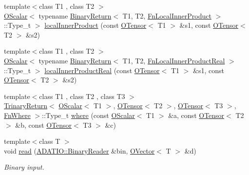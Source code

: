 \begin{DoxyCompactItemize}
\item 
{\footnotesize template$<$class T1 , class T2 $>$ }\\\mbox{\hyperlink{classENSEM_1_1OScalar}{O\+Scalar}}$<$ typename \mbox{\hyperlink{structENSEM_1_1BinaryReturn}{Binary\+Return}}$<$ T1, T2, \mbox{\hyperlink{structENSEM_1_1FnLocalInnerProduct}{Fn\+Local\+Inner\+Product}} $>$\+::Type\+\_\+t $>$ \mbox{\hyperlink{group__obstensor_gaffb6c3d07f9c4ba10a5712ce49725d68}{local\+Inner\+Product}} (const \mbox{\hyperlink{classENSEM_1_1OTensor}{O\+Tensor}}$<$ T1 $>$ \&s1, const \mbox{\hyperlink{classENSEM_1_1OTensor}{O\+Tensor}}$<$ T2 $>$ \&s2)
\item 
{\footnotesize template$<$class T1 , class T2 $>$ }\\\mbox{\hyperlink{classENSEM_1_1OScalar}{O\+Scalar}}$<$ typename \mbox{\hyperlink{structENSEM_1_1BinaryReturn}{Binary\+Return}}$<$ T1, T2, \mbox{\hyperlink{structENSEM_1_1FnLocalInnerProductReal}{Fn\+Local\+Inner\+Product\+Real}} $>$\+::Type\+\_\+t $>$ \mbox{\hyperlink{group__obstensor_ga39e2368c90f850b08cd366076195fbc4}{local\+Inner\+Product\+Real}} (const \mbox{\hyperlink{classENSEM_1_1OTensor}{O\+Tensor}}$<$ T1 $>$ \&s1, const \mbox{\hyperlink{classENSEM_1_1OTensor}{O\+Tensor}}$<$ T2 $>$ \&s2)
\item 
{\footnotesize template$<$class T1 , class T2 , class T3 $>$ }\\\mbox{\hyperlink{structENSEM_1_1TrinaryReturn}{Trinary\+Return}}$<$ \mbox{\hyperlink{classENSEM_1_1OScalar}{O\+Scalar}}$<$ T1 $>$, \mbox{\hyperlink{classENSEM_1_1OTensor}{O\+Tensor}}$<$ T2 $>$, \mbox{\hyperlink{classENSEM_1_1OTensor}{O\+Tensor}}$<$ T3 $>$, \mbox{\hyperlink{structENSEM_1_1FnWhere}{Fn\+Where}} $>$\+::Type\+\_\+t \mbox{\hyperlink{group__obstensor_ga11064bec720719323becc2499a52e251}{where}} (const \mbox{\hyperlink{classENSEM_1_1OScalar}{O\+Scalar}}$<$ T1 $>$ \&a, const \mbox{\hyperlink{classENSEM_1_1OTensor}{O\+Tensor}}$<$ T2 $>$ \&b, const \mbox{\hyperlink{classENSEM_1_1OTensor}{O\+Tensor}}$<$ T3 $>$ \&c)
\item 
{\footnotesize template$<$class T $>$ }\\void \mbox{\hyperlink{group__obsvector_ga78b51667ce539bc967764a39c77afbe0}{read}} (\mbox{\hyperlink{classADATIO_1_1BinaryReader}{A\+D\+A\+T\+I\+O\+::\+Binary\+Reader}} \&bin, \mbox{\hyperlink{classENSEM_1_1OVector}{O\+Vector}}$<$ T $>$ \&d)
\begin{DoxyCompactList}\small\item\em Binary input. \end{DoxyCompactList}\item 

\end{DoxyCompactItemize}
